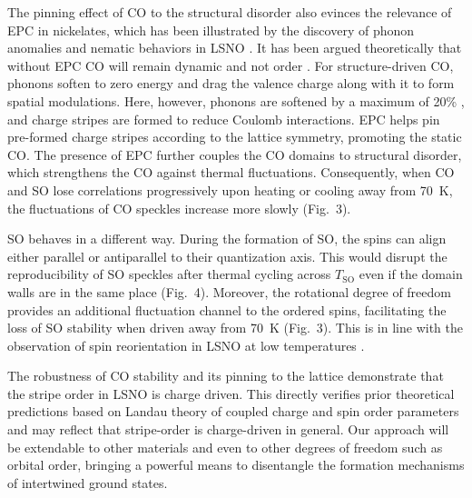 \documentclass[aps,prl,showpacs,floatfix,twocolumn,superscriptaddress,longbibliography]{revtex4-1}
\def\TSO{\ensuremath{T_{\mathrm{SO}}}}
\begin{document}

The pinning effect of \gls{CO} to the structural disorder also evinces the relevance of \gls{EPC} in nickelates, which has been illustrated by the discovery of phonon anomalies and nematic behaviors in \gls{LSNO} \cite{Pashkevich2000stripe, Tranquada2002LSNO, Merritt2020phonon, Zhong2017LSNO}. It has been argued theoretically that without \gls{EPC} \gls{CO} will remain dynamic and not order \cite{Hotta2004LSNO}. For structure-driven \gls*{CO}, phonons soften to zero energy and drag the valence charge along with it to form spatial modulations. Here, however, phonons are softened by a maximum of 20\% \cite{Tranquada2002LSNO}, and charge stripes are formed to reduce Coulomb interactions. \gls*{EPC} helps pin pre-formed charge stripes according to the lattice symmetry, promoting the static \gls{CO}. The presence of \gls{EPC} further couples the \gls{CO} domains to structural disorder, which strengthens the \gls{CO} against thermal fluctuations. Consequently, when \gls{CO} and \gls{SO} lose correlations progressively upon heating or cooling away from 70~K, the fluctuations of \gls{CO} speckles increase more slowly (Fig.~3).

\gls{SO} behaves in a different way. During the formation of \gls{SO}, the spins can align either parallel or antiparallel to their quantization axis. This would disrupt the reproducibility of \gls{SO} speckles after thermal cycling across {\TSO} even if the domain walls are in the same place (Fig.~4). Moreover, the rotational degree of freedom provides an additional fluctuation channel to the ordered spins, facilitating the loss of \gls{SO} stability when driven away from 70~K (Fig.~3). This is in line with the observation of spin reorientation in \gls{LSNO} at low temperatures \cite{Lee2001LSNO, Freeman2004LSNO, Freeman2006magnetization}.


The robustness of \gls{CO} stability and its pinning to the lattice demonstrate that the stripe order in \gls{LSNO} is charge driven. This directly verifies prior theoretical predictions based on Landau theory of coupled charge and spin order parameters \cite{Zachar1998Landau} and may reflect that stripe-order is charge-driven in general. Our approach will be extendable to other materials and even to other degrees of freedom such as orbital order, bringing a powerful means to disentangle the formation mechanisms of intertwined ground states.
\end{document}

